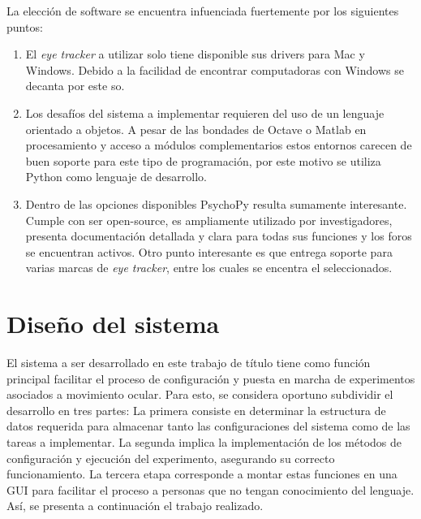 \documentclass[\main/main.tex]{subfiles}
\begin{document}
	\newpage
	La elección de software se encuentra infuenciada fuertemente por los siguientes puntos:
	\begin{enumerate}
		\item El \textit{eye tracker} a utilizar solo tiene disponible sus drivers para Mac y Windows. Debido a la facilidad de encontrar computadoras con Windows se decanta por este \acrshort{so}.

		\item Los desafíos del sistema a implementar requieren del uso de un lenguaje orientado a objetos. A pesar de las bondades de Octave o Matlab en procesamiento y acceso a módulos complementarios estos entornos carecen de buen soporte para este tipo de programación, por este motivo se utiliza Python como lenguaje de desarrollo. 

		\item Dentro de las opciones disponibles PsychoPy resulta sumamente interesante. Cumple con ser open-source, es ampliamente utilizado por investigadores, presenta documentación detallada y clara para todas sus funciones y los foros se encuentran activos. Otro punto interesante es que entrega soporte para varias marcas de \textit{eye tracker}, entre los cuales se encentra el seleccionados.

	\end{enumerate}

\section{Diseño del sistema}
\label{sec:03_diseño_sistema}
	El sistema a ser desarrollado en este trabajo de título tiene como función principal facilitar el proceso de configuración y puesta en marcha de experimentos asociados a movimiento ocular. Para esto, se considera oportuno subdividir el desarrollo en tres partes: La primera consiste en determinar la estructura de datos requerida para almacenar tanto las configuraciones del sistema como de las tareas a implementar. La segunda implica la implementación de los métodos de configuración y ejecución del experimento, asegurando su correcto funcionamiento. La tercera etapa corresponde a montar estas funciones en una GUI para facilitar el proceso a personas que no tengan conocimiento del lenguaje. Así, se presenta a continuación el trabajo realizado.
\end{document}
